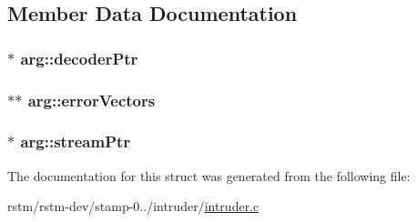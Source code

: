 \subsection{Member Data Documentation}
\hypertarget{structarg_aa1c5e345d98f5457778fca28980da18d}{
\subsubsection[{decoder\-Ptr}]{$\ast$ arg\-::decoder\-Ptr}}\label{structarg_aa1c5e345d98f5457778fca28980da18d}
\hypertarget{structarg_a272214d5c22ca222e8883e3dc7cd5001}{
\subsubsection[{error\-Vectors}]{$\ast$$\ast$ arg\-::error\-Vectors}}\label{structarg_a272214d5c22ca222e8883e3dc7cd5001}
\hypertarget{structarg_ad3b633aa3fe0587991c98ee6598ca665}{
\subsubsection[{stream\-Ptr}]{$\ast$ arg\-::stream\-Ptr}}\label{structarg_ad3b633aa3fe0587991c98ee6598ca665}


The documentation for this struct was generated from the following file\-:\begin{DoxyCompactItemize}
\item 
rstm/rstm-\/dev/stamp-\/0../intruder/\hyperlink{intruder_8c}{intruder.\-c}\end{DoxyCompactItemize}
